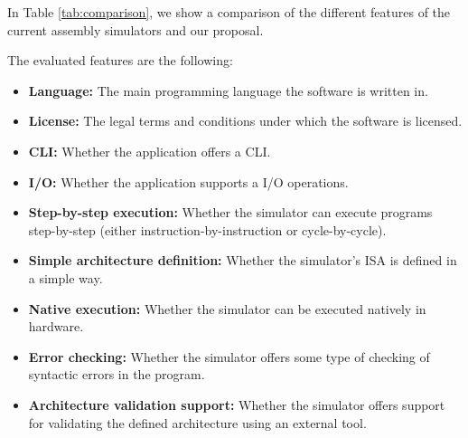 In Table \ref{tab:comparison}, we show a comparison of the different features of the current assembly simulators and our proposal.  %

The evaluated features are the following:
\begin{itemize}
  \item \textbf{Language:} The main \gls{programming language} the software is written in.
  \item \textbf{License:} The legal terms and conditions under which the software is licensed.
  \item \textbf{\gls{CLI}:} Whether the application offers a \gls{CLI}.
  \item \textbf{\gls{I/O}:} Whether the application supports a \gls{I/O} operations.
  \item \textbf{Step-by-step execution:} Whether the simulator can execute programs step-by-step (either instruction-by-instruction or cycle-by-cycle).
  \item \textbf{Simple architecture definition:} Whether the simulator's \gls{ISA} is defined in a simple way.
  \item \textbf{Native execution:} Whether the simulator can be executed natively in hardware.
  \item \textbf{Error checking:} Whether the simulator offers some type of checking of syntactic errors in the program.
  \item \textbf{Architecture validation support:} Whether the simulator offers support for validating the defined architecture using an external tool.
\end{itemize}

